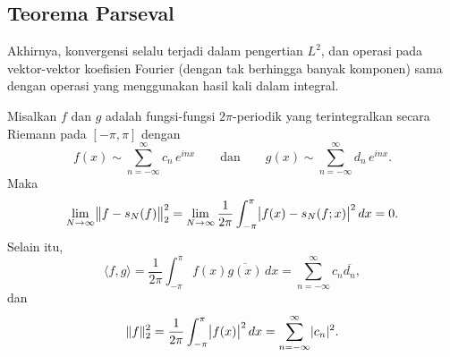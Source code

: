 \subsection{Teorema Parseval}

Akhirnya,
konvergensi selalu terjadi dalam pengertian $L^2$, dan
operasi pada vektor-vektor koefisien Fourier
(dengan tak berhingga banyak komponen) sama dengan operasi yang menggunakan
hasil kali dalam integral.

\begin{samepage}
\begin{thm} 
Misalkan $f$ dan $g$ adalah fungsi-fungsi $2\pi$-periodik yang terintegralkan secara Riemann
pada $[-\pi,\pi]$
dengan
\begin{equation*}
f(x) \sim
\sum_{n=-\infty}^\infty c_n \,e^{inx}
\qquad \text{dan} \qquad
g(x) \sim
\sum_{n=-\infty}^\infty d_n \,e^{inx} .
\end{equation*}
Maka
\begin{equation*}
\lim_{N\to\infty} \bigl\lVert {f-s_N(f)} \bigr\rVert_2^2 = 
\lim_{N\to\infty}
\frac{1}{2\pi}
\int_{-\pi}^\pi
\bigl\lvert {f(x)-s_N(f;x)} \bigr\rvert^2 \, dx
=0 .
\end{equation*}
Selain itu,
\begin{equation*}
\langle f , g \rangle =
\frac{1}{2\pi}
\int_{-\pi}^\pi
f(x) \overline{g(x)}\, dx
=
\sum_{n=-\infty}^\infty c_n \overline{d_n} ,
\end{equation*}
dan
\begin{equation*}
\lVert {f} \rVert_2^2
=
\frac{1}{2\pi}
\int_{-\pi}^\pi
\bigl\lvert {f(x)} \bigr\rvert^2 \, dx
=
\sum_{n=-\infty}^\infty \lvert {c_n} \rvert^2.
\end{equation*}
\end{thm}
\end{samepage}

